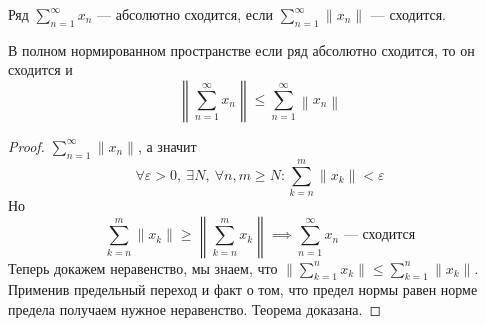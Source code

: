 \begin{conj}
  Ряд $\sum\limits_{n = 1}^{\infty} x_n$ --- абсолютно сходится, если
  $\sum\limits_{n = 1}^{\infty} \|x_n\|$ --- сходится.
\end{conj}

\begin{theorem}
  В полном нормированном пространстве если ряд абсолютно сходится, то он сходится и
  \begin{equation*}
    \left\|\sum\limits_{n = 1}^{\infty} x_n\right\| \leq
    \sum\limits_{n = 1}^{\infty}\left\|x_n\right\|
  \end{equation*}
\end{theorem}
\begin{proof}
  $\sum\limits_{n = 1}^{\infty}\|x_n\|$, а значит
  \begin{equation*}
    \forall \varepsilon > 0, \: \exists N, \: \forall n, m \geq N\colon \sum\limits_{k = n}^{m} \|x_k\| < \varepsilon
  \end{equation*}
  Но
  \begin{equation*}
    \sum\limits_{k = n}^{m} \| x_k \| \geq \left\| \sum\limits_{k = n}^{m} x_k \right\| \implies
  \sum\limits_{n = 1}^{\infty} x_n\text{ --- сходится}
  \end{equation*}
  Теперь докажем неравенство, мы знаем, что $\Big \| \sum\limits_{k = 1}^{n} x_k \Big \| \leq \sum\limits_{k = 1}^{n} \| x_k \|$. Применив предельный переход и факт о том, что предел нормы равен норме предела получаем нужное неравенство. Теорема доказана.
\end{proof}

